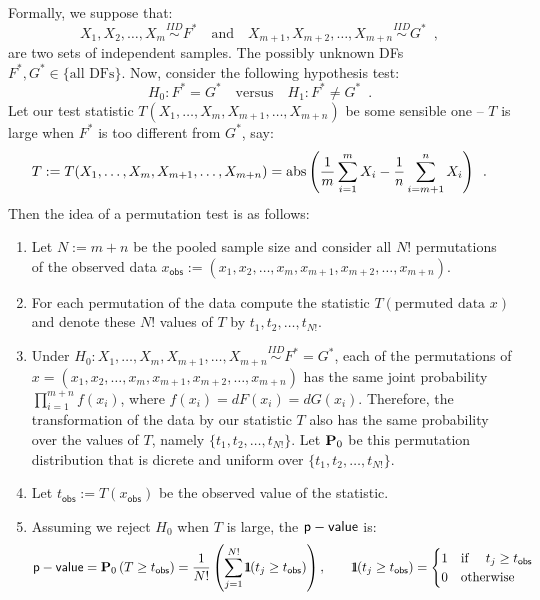 Formally, we suppose that:
\[
X_1,X_2,\ldots,X_m \overset{IID}{\sim} F^* \quad \text{and} \quad X_{m+1}, X_{m+2},\ldots,X_{m+n} \overset{IID}{\sim} G^* \enspace ,
\]
are two sets of independent samples.  The possibly unknown DFs $F^*,G^* \in \{ \text{all DFs} \}$.  Now, consider the following hypothesis test:
\[
H_0: F^*=G^* \quad \text{versus} \quad H_1: F^* \neq G^* \enspace .
\]
Let our test statistic $T(X_1,\ldots,X_m,X_{m+1},\ldots,X_{m+n})$ be some sensible one -- $T$ is large when $F^*$ is too different from $G^*$, say:
\[
T:=T(X_1,\ldots,X_m,X_{m+1},\ldots,X_{m+n})= {\mathop{\rm abs}} \left( \frac{1}{m} \sum_{i=1}^m X_i -  \frac{1}{n} \sum_{i=m+1}^n X_i  \right) \enspace .
\]
Then the idea of a permutation test is as follows:
\begin{enumerate}
\item Let $N:=m+n$ be the pooled sample size and consider all $N!$ permutations of the observed data $x_{\mathsf{obs}}:=(x_1,x_2,\ldots,x_m,x_{m+1},x_{m+2},\ldots,x_{m+n})$.
\item For each permutation of the data compute the statistic $T(\text{permuted data $x$})$ and denote these $N!$ values of $T$ by $t_1,t_2,\ldots,t_{N!}$.
\item Under $H_0: X_1,\ldots,X_m,X_{m+1},\ldots,X_{m+n} \overset{IID}{\sim}F^*=G^*$, each of the permutations of $x= (x_1,x_2,\ldots,x_m,x_{m+1},x_{m+2},\ldots,x_{m+n})$ has the same joint probability $\prod_{i=1}^{m+n} f(x_i)$, where $f(x_i)=dF(x_i)=dG(x_i)$.  Therefore, the transformation of the data by our statistic $T$ also has the same probability over the values of $T$, namely $\{t_1,t_2,\ldots,t_{N!}\}$.  Let $\mathbf{P}_0$ be this permutation distribution that is dicrete and uniform over  $\{t_1,t_2,\ldots,t_{N!}\}$.
\item Let $t_{\mathsf{obs}} := T(x_{\mathsf{obs}})$ be the observed value of the statistic.
\item Assuming we reject $H_0$ when $T$ is large, the $\mathsf{p-value}$ is:
\[
\mathsf{p-value} = \mathbf{P}_0 \left( T \geq t_{\mathsf{obs}} \right) = \frac{1}{N!} \left( \sum_{j=1}^{N!} {1}\mspace{-11 mu}{1} (t_j  \geq t_{\mathsf{obs}}) \right), \qquad  {1}\mspace{-11 mu}{1} (t_j \geq t_{\mathsf{obs}}) =
\begin{cases}
1 & \text{if } \quad t_j \geq t_{\mathsf{obs}} \\
0 & \text{otherwise} 
\end{cases}
\]
\end{enumerate}


